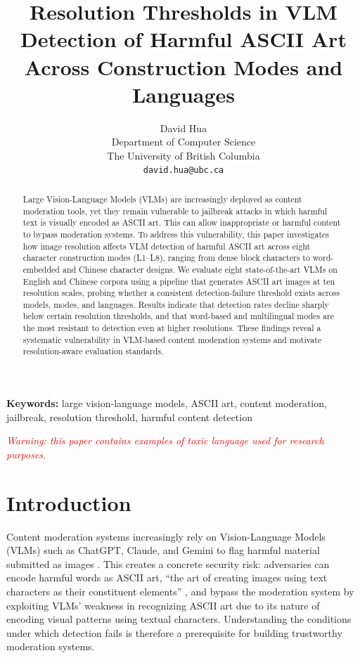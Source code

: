 \documentclass[11pt]{article}
\title{Resolution Thresholds in VLM Detection of Harmful ASCII Art Across Construction Modes and Languages}
\author{David Hua \\
  Department of Computer Science \\
  The University of British Columbia \\
  \texttt{david.hua@ubc.ca}}
\begin{document}
\maketitle

\begin{abstract}
Large Vision-Language Models (VLMs) are increasingly deployed as content moderation tools, yet they
remain vulnerable to jailbreak attacks in which harmful text is visually encoded as ASCII art. 
This can allow inappropriate or harmful content to bypass moderation systems.
To address this vulnerability, this paper investigates how image resolution affects VLM detection of harmful ASCII art
across eight character construction modes (L1--L8), ranging from dense block characters to
word-embedded and Chinese character designs. We evaluate eight state-of-the-art VLMs on English and 
Chinese corpora using a pipeline that generates ASCII art images at ten resolution scales, 
probing whether a consistent detection-failure threshold exists across models, modes, and languages. 
Results indicate that detection rates decline sharply below certain resolution thresholds, 
and that word-based and multilingual modes are the most resistant to detection even at higher resolutions. 
These findings reveal a systematic vulnerability in VLM-based content moderation systems 
and motivate resolution-aware evaluation standards.
\end{abstract}

\noindent\textbf{Keywords:} large vision-language models, ASCII art, content moderation, jailbreak,
resolution threshold, harmful content detection

\smallskip
\noindent\textcolor{red}{\textit{Warning: this paper contains examples of toxic language used for research purposes.}}

\section{Introduction}

Content moderation systems increasingly rely on Vision-Language Models (VLMs) such as ChatGPT, Claude, and Gemini to flag harmful
material submitted as images \citep{openai2025chatgpt,anthropic2025claude,google2025gemini}.
This creates a concrete security risk: adversaries can encode harmful words as ASCII art, %
``the art of creating images using text characters as their constituent elements''
\citep{ogrady2008automatic}, %
and bypass the moderation system by exploiting VLMs' weakness in recognizing ASCII art 
due to its nature of encoding visual patterns using textual characters. Understanding the conditions under which
detection fails is therefore a prerequisite for building trustworthy moderation systems.
\end{document}

